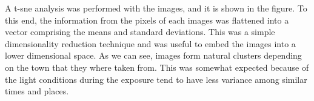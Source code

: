 \begin{figure}[h]
  \begin{center}
  \end{center}
\end{figure}

\begin{figure}[h]
  \begin{center}
  \end{center}
\end{figure}

A t-sne analysis was performed with the images, and it is shown in the figure. To this end, the information from the pixels of each images was flattened into a vector comprising the means and standard deviations. This was a simple dimensionality reduction technique and was useful to embed the images into a lower dimensional space. As we can see, images form natural clusters depending on the town that they where taken from. This was somewhat expected because of the light conditions during the exposure tend to have less variance among similar times and places.


